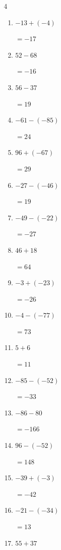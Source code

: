 \begin{multicols}{4}
\begin{enumerate}
  \item $-13+(-4)$

        $=-17$

  \item $52-68$

        $=-16$

\columnbreak %

  \item $56-37$

        $=19$

  \item $-61-(-85)$

        $=24$

  \item $96+(-67)$

        $=29$

  \item $-27-(-46)$

        $=19$

  \item $-49-(-22)$

        $=-27$

  \item $46+18$

        $=64$

  \item $-3+(-23)$

        $=-26$

  \item $-4-(-77)$

        $=73$

  \item $5+6$

        $=11$

  \item $-85-(-52)$

        $=-33$

  \item $-86-80$

        $=-166$

  \item $96-(-52)$

        $=148$

  \item $-39+(-3)$

        $=-42$

  \item $-21-(-34)$

        $=13$

  \item $55+37$


\end{enumerate}
\end{multicols}
